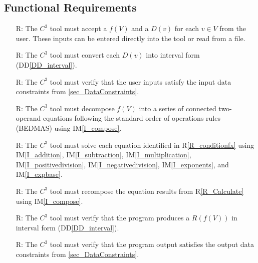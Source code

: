 \documentclass[12pt]{article}
\newcommand{\ddref}[1]{DD\ref{#1}}
\newcommand{\iref}[1]{IM\ref{#1}}
\newcounter{reqnum} %
\newcommand{\rref}[1]{R\ref{#1}}
\newcommand{\prognameAbbrv}{$C^{3}$}
\begin{document}
\subsection{Functional Requirements}

\noindent \begin{itemize}

\item[R\refstepcounter{reqnum}\thereqnum \label{R_Inputs}:] The 
\prognameAbbrv{} tool must accept a $f(V)$ and a $D(v)$ for each $v \in V$ from 
the user. These inputs can be entered directly into the tool or read from a 
file.

\item[R\refstepcounter{reqnum}\thereqnum \label{R_conditionX}:] The 
\prognameAbbrv{} tool must convert each $D(v)$ into interval form 
(\ddref{DD_interval}).

\item[R\refstepcounter{reqnum}\thereqnum \label{R_verifyinputs}:] The 
\prognameAbbrv{} tool must verify that the user inputs satisfy the input data 
constraints from \ref{sec_DataConstraints}.

\item[R\refstepcounter{reqnum}\thereqnum \label{R_conditionfx}:] The 
\prognameAbbrv{} tool must decompose $f(V)$ into a series of connected 
two-operand equations following the standard order of operations rules (BEDMAS) 
using \iref{I_compose}.

\item[R\refstepcounter{reqnum}\thereqnum \label{R_Calculate}:] The 
\prognameAbbrv{} tool must solve each equation identified in 
\rref{R_conditionfx} using \iref{I_addition}, \iref{I_subtraction}, 
\iref{I_multiplication}, \iref{I_positivedivision}, \iref{I_negativedivision}, 
\iref{I_exponents}, and \iref{I_expbase}.

\item[R\refstepcounter{reqnum}\thereqnum \label{R_CalculateCompose}:] The 
\prognameAbbrv{} tool must recompose the equation results from 
\rref{R_Calculate} using \iref{I_compose}.

\item[R\refstepcounter{reqnum}\thereqnum \label{R_VerifyOutput}:] The 
\prognameAbbrv{} tool must verify that the program produces a $R(f(V))$ in 
interval form (\ddref{DD_interval}).

\item[R\refstepcounter{reqnum}\thereqnum \label{R_VerifyOutputConstraints}:] 
The \prognameAbbrv{} tool must verify that the program output satisfies the 
output data constraints from \ref{sec_DataConstraints}.


\end{itemize}
\end{document}
